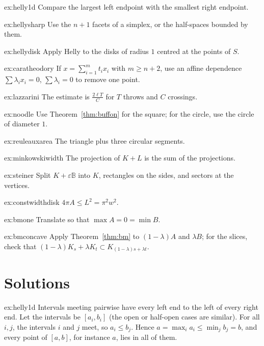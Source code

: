 \begin{hint}{ex:helly1d}
Compare the largest left endpoint with the smallest right endpoint.
\end{hint}
\begin{hint}{ex:hellysharp}
Use the $n+1$ facets of a simplex, or the half-spaces bounded by them.
\end{hint}
\begin{hint}{ex:hellydisk}
Apply Helly to the disks of radius $1$ centred at the points of $S$.
\end{hint}
\begin{hint}{ex:caratheodory}
If $x=\sum_{i=1}^mt_ix_i$ with $m\ge n+2$, use an affine dependence $\sum\lambda_ix_i=0$, $\sum\lambda_i=0$ to remove one point.
\end{hint}
\begin{hint}{ex:lazzarini}
The estimate is $\frac{2\ell T}C$ for $T$ throws and $C$ crossings.
\end{hint}
\begin{hint}{ex:noodle}
Use Theorem~\ref{thm:buffon} for the square; for the circle, use the circle of diameter $1$.
\end{hint}
\begin{hint}{ex:reuleauxarea}
The triangle plus three circular segments.
\end{hint}
\begin{hint}{ex:minkowskiwidth}
The projection of $K+L$ is the sum of the projections.
\end{hint}
\begin{hint}{ex:steiner}
Split $K+\varepsilon\mathbb B$ into $K$, rectangles on the sides, and sectors at the vertices.
\end{hint}
\begin{hint}{ex:constwidthdisk}
$4\pi A\le L^2=\pi^2w^2$.
\end{hint}
\begin{hint}{ex:bmone}
Translate so that $\max A=0=\min B$.
\end{hint}
\begin{hint}{ex:bmconcave}
Apply Theorem~\ref{thm:bm} to $(1-\lambda)A$ and $\lambda B$; for the slices, check that $(1-\lambda)K_s+\lambda K_t\subset K_{(1-\lambda)s+\lambda t}$.
\end{hint}

\section{Solutions}

\begin{solution}{ex:helly1d}
\idea Intervals meeting pairwise have every left end to the left of every right end.
\writeup Let the intervals be $[a_i,b_i]$ (the open or half-open cases are similar). For all $i,j$, the intervals $i$ and $j$ meet, so $a_i\le b_j$. Hence
$a=\max_ia_i\le\min_jb_j=b$, and every point of $[a,b]$, for instance $a$, lies in all of them.
\end{solution}

